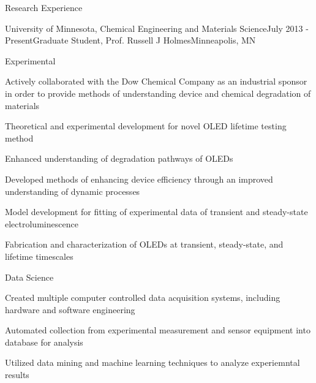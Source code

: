 \documentclass{resume} %
\begin{document}

\begin{rSection}{Research Experience}

\begin{rSubsection}{University of Minnesota, Chemical Engineering and Materials Science}{July 2013 - Present}{Graduate Student, Prof. Russell J Holmes}{Minneapolis, MN}
\vspace{-.5 em}
\hspace{-1em}{\em Supported via UMN-Dow Chemical University Partnership Initiative} \smallskip \\
\begin{rSubsubsection}{Experimental}
\item Actively collaborated with the Dow Chemical Company as an industrial sponsor in order to provide methods of understanding device and chemical degradation of materials 
\item Theoretical and experimental development for novel OLED lifetime testing method 
\item Enhanced understanding of degradation pathways of OLEDs
\item Developed methods of enhancing device efficiency through an improved understanding of dynamic processes 
\item Model development for fitting of experimental data of transient and steady-state electroluminescence 
\item Fabrication and characterization of OLEDs at transient, steady-state, and lifetime timescales
\end{rSubsubsection}
\begin{rSubsubsection}{Data Science}
\item Created multiple computer controlled data acquisition systems, including hardware and software engineering
\item Automated collection from experimental measurement and sensor equipment into database for analysis
\item Utilized data mining and machine learning techniques to analyze experiemntal results

\end{rSubsubsection}
\end{rSubsection}
\end{rSection}
\end{document}
